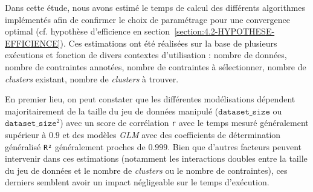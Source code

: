 			Dans cette étude, nous avons estimé le temps de calcul des différents algorithmes implémentés afin de confirmer le choix de paramétrage pour une convergence optimal (cf. hypothèse d'efficience en section~\ref{section:4.2-HYPOTHESE-EFFICIENCE}).
			Ces estimations ont été réalisées sur la base de plusieurs exécutions et fonction de divers contextes d'utilisation : nombre de données, nombre de contraintes annotées, nombre de contraintes à sélectionner, nombre de \textit{clusters} existant, nombre de \textit{clusters} à trouver.
			
			En premier lieu, on peut constater que les différentes modélisations dépendent majoritairement de la taille du jeu de données manipulé ($\texttt{dataset\_size}$ ou $\texttt{dataset\_size}^{2}$) avec un score de corrélation \texttt{r} avec le temps mesuré généralement supérieur à $0.9$ et des modèles \textit{GLM} avec des coefficients de détermination généralisé \texttt{R²} généralement proches de $0.999$.
			Bien que d'autres facteurs peuvent intervenir dans ces estimations (notamment les interactions doubles entre la taille du jeu de données et le nombre de \textit{clusters} ou le nombre de contraintes), ces derniers semblent avoir un impact négligeable sur le temps d'exécution.
			

